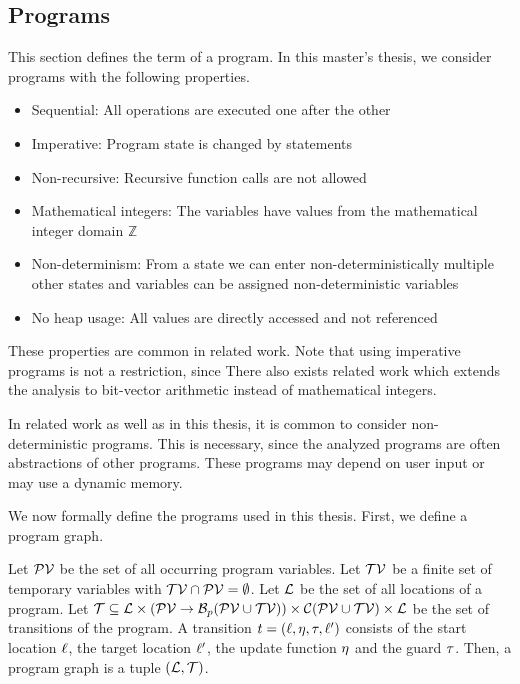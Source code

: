 \subsection{Programs}

This section defines the term of a program.
In this master's thesis, we consider programs with the following properties.

\begin{itemize}
\item Sequential: All operations are executed one after the other
\item Imperative: Program state is changed by statements
\item Non-recursive: Recursive function calls are not allowed
\item Mathematical integers: The variables have values from the mathematical integer domain $\mathbb{Z}$
\item Non-determinism: From a state we can enter non-deterministically multiple other states and variables can be assigned non-deterministic variables
\item No heap usage: All values are directly accessed and not referenced
\end{itemize}

These properties are common in related work.
Note that using imperative programs is not a restriction, since 
There also exists related work which extends the analysis to bit-vector arithmetic instead of mathematical integers. \cite{bitvectorarithmetic}

In related work as well as in this thesis, it is common to consider non-deterministic programs.
This is necessary, since the analyzed programs are often abstractions of other programs.
These programs may depend on user input or may use a dynamic memory.


We now formally define the programs used in this thesis.
First, we define a program graph.

\begin{definition} 
  Let $\mathcal{PV}$ be the set of all occurring program variables.
  Let $\mathcal{TV}$ be a finite set of temporary variables with $\mathcal{TV} \cap \mathcal{PV} = \emptyset$.
  Let $\mathcal{L}$ be the set of all locations of a program.
  Let $\mathcal{T} \subseteq \mathcal{L} \times (\mathcal{PV} \rightarrow \mathcal{B}_p(\mathcal{PV} \cup \mathcal{TV})) \times \mathcal{C}(\mathcal{PV} \cup \mathcal{TV}) \times \mathcal{L}$ be the set of transitions of the program.
  A transition $t = (\ell, \eta, \tau, \ell')$ consists of the start location $\ell$, the target location $\ell'$, the update function $\eta$ and the guard $\tau$. 
  Then, a program graph is a tuple $(\mathcal{L}, \mathcal{T})$.
\end{definition}

